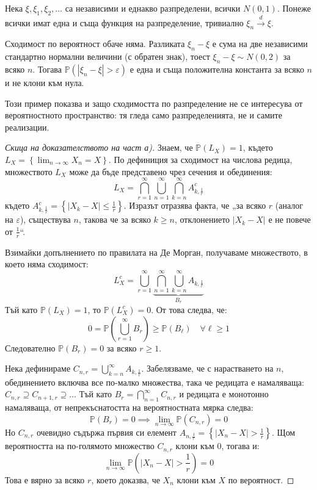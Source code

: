 \begin{supp}
\label{ex:10-samedist}
Нека $\xi, \xi_1, \xi_2, \dots$ са независими и еднакво разпределени, всички $N(0,1)$.
Понеже всички имат една и съща функция на разпределение, тривиално
$\xi_n \xrightarrow{d} \xi$.

Сходимост по вероятност обаче няма. Разликата $\xi_n - \xi$ е сума на две независими
стандартно нормални величини (с обратен знак), тоест $\xi_n - \xi \sim N(0,2)$ за всяко $n$.
Тогава $\mathbb{P}(|\xi_n - \xi| > \varepsilon)$ е една и съща положителна константа за всяко
$n$ и не клони към нула.

Този пример показва и защо сходимостта по разпределение не се интересува от
вероятностното пространство: тя гледа само разпределенията, не и самите реализации.
\end{supp}

\begin{proof}[Скица на доказателството на част а)]
Знаем, че $\mathbb{P}(L_X) = 1$, където $L_X = \left\{ \lim_{n\to\infty} X_n = X \right\}$. По дефиниция за сходимост на числова редица, множеството $L_X$ може да бъде представено чрез сечения и обединения:
\[
L_X = \bigcap_{r=1}^{\infty} \bigcup_{n=1}^{\infty} \bigcap_{k=n}^{\infty} A_{k, \frac{1}{r}}^{c}
\]
където $A_{k, \frac{1}{r}}^{c} = \left\{ |X_k - X| \le \frac{1}{r} \right\}$. Изразът отразява факта, че „за всяко $r$ (аналог на $\varepsilon$), съществува $n$, такова че за всяко $k \ge n$, отклонението $|X_k - X|$ е не повече от $\frac{1}{r}$“.

Взимайки допълнението по правилата на Де Морган, получаваме множеството, в което няма сходимост:
\[
L_X^c = \bigcup_{r=1}^{\infty} \underbrace{\bigcap_{n=1}^{\infty} \bigcup_{k=n}^{\infty} A_{k, \frac{1}{r}}}_{B_r}
\]
Тъй като $\mathbb{P}(L_X) = 1$, то $\mathbb{P}(L_X^c) = 0$. От това следва, че:
\[
0 = \mathbb{P}\left(\bigcup_{r=1}^{\infty} B_r\right) \ge \mathbb{P}(B_\ell) \quad \forall \ell \ge 1
\]
Следователно $\mathbb{P}(B_r) = 0$ за всяко $r \ge 1$.

Нека дефинираме $C_{n, r} = \bigcup_{k=n}^{\infty} A_{k, \frac{1}{r}}$. Забелязваме, че с нарастването на $n$, обединението включва все по-малко множества, така че редицата е намаляваща: $C_{n, r} \supseteq C_{n+1, r} \supseteq \dots$
Тъй като $B_r = \bigcap_{n=1}^{\infty} C_{n, r}$ и редицата е монотонно намаляваща, от непрекъснатостта на вероятностната мярка следва:
\[
\mathbb{P}(B_r) = 0 \implies \lim_{n\to\infty} \mathbb{P}(C_{n, r}) = 0
\]
Но $C_{n, r}$ очевидно съдържа първия си елемент $A_{n, \frac{1}{r}} = \left\{ |X_n - X| > \frac{1}{r} \right\}$. Щом вероятността на по-голямото множество $C_{n, r}$ клони към 0, тогава и:
\[
\lim_{n\to\infty} \mathbb{P}\left(|X_n - X| > \frac{1}{r}\right) = 0
\]
Това е вярно за всяко $r$, което доказва, че $X_n$ клони към $X$ по вероятност.

\end{proof}

